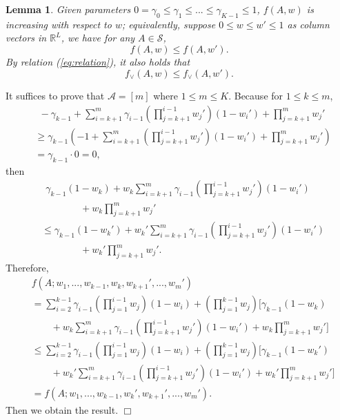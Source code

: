 \documentclass{article}
\newcommand{\RR}{\mathbb{R}}
\newcommand{\cA}{\mathcal{A}}
\newcommand{\cS}{\mathcal{S}}
\newtheorem{lemma}[theorem]{Lemma}%
\newenvironment{proof}{\noindent {\textbf{Proof. }}}{$\Box$ \medskip}
\begin{document}
\begin{lemma}
\label{lem:increasing} 
Given parameters $0= \gamma_0 \leq \gamma_1 \leq ... \leq \gamma_{K-1} \leq 1$, $f(A, w)$ is increasing with respect to $w$; equivalently, suppose $0 \leq w \leq w' \leq 1$ as column vectors in $\RR^L$, we have for any $A\in\cS$,
$$
f(A, w) \leq f(A, w').
$$
By relation (\ref{eq:relation}), it also holds that
$$
f_{\vee}(A, w) \leq f_{\vee}(A, w').
$$
\end{lemma}
\begin{proof}
It suffices to prove that $\cA = [m]$ where $1 \leq m \leq K$. Because for $1 \leq k \leq m$,
\begin{align*}
&~~-\gamma_{k-1} + \sum_{i=k+1}^m \gamma_{i-1}(\prod_{j=k+1}^{i-1}w_j')(1- w_i') + \prod_{j=k+1}^{m}w_j'\\
&\geq \gamma_{k-1} (-1 + \sum_{i=k+1}^m (\prod_{j=k+1}^{i-1}w_j')(1- w_i') +  \prod_{j=k+1}^{m}w_j')\\
&=\gamma_{k-1} \cdot 0 = 0,
\end{align*}
then
\begin{align*}
&~~\gamma_{k-1} (1 - w_k) + w_k\sum_{i=k+1}^m \gamma_{i-1}(\prod_{j=k+1}^{i-1}w_j')(1- w_i')\\
&\qquad \qquad + w_k\prod_{j=k+1}^{m}w_j'\\
& \leq \gamma_{k-1} (1 - w_k') + w_k'\sum_{i=k+1}^m \gamma_{i-1}(\prod_{j=k+1}^{i-1}w_j')(1- w_i')\\
&\qquad \qquad + w_k'\prod_{j=k+1}^{m}w_j'.
\end{align*}
Therefore, 
\begin{align*}
& f(A; w_1,...,w_{k-1},w_k,w_{k+1}',...,w_m')\\
&=\sum_{i=2}^{k-1} \gamma_{i-1} (\prod_{j=1}^{i-1}w_j)(1 - w_i) + (\prod_{j=1}^{k-1}w_j) [\gamma_{k-1} (1 - w_k) \\
&\qquad + w_k\sum_{i=k+1}^m \gamma_{i-1}(\prod_{j=k+1}^{i-1}w_j')(1- w_i') + w_k\prod_{j=k+1}^{m}w_j']\\
&\leq \sum_{i=2}^{k-1} \gamma_{i-1} (\prod_{j=1}^{i-1}w_j) (1 - w_i) + (\prod_{j=1}^{k-1}w_j) [\gamma_{k-1} (1 - w_k') \\
&\qquad + w_k'\sum_{i=k+1}^m \gamma_{i-1} (\prod_{j=k+1}^{i-1}w_j')(1- w_i') + w_k'\prod_{j=k+1}^{m}w_j']\\
&=f(A; w_1,...,w_{k-1},w_{k}',w_{k+1}',...,w_m').
\end{align*}
Then we obtain the result.
\end{proof}
\end{document}
